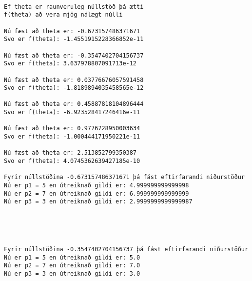 \documentclass[11pt]{article}
\begin{document}
    \begin{center}
    \end{center}
    { \hspace*{\fill} \\}
    
    \begin{Verbatim}[commandchars=\\\{\}]
Ef theta er raunveruleg núllstöð þá ætti
f(theta) að vera mjög nálægt núlli 

Nú fæst að theta er: -0.673157486371671
Svo er f(theta): -1.4551915228366852e-11 

Nú fæst að theta er: -0.3547402704156737
Svo er f(theta): 3.637978807091713e-12 

Nú fæst að theta er: 0.03776676057591458
Svo er f(theta): -1.8189894035458565e-12 

Nú fæst að theta er: 0.45887818104896444
Svo er f(theta): -6.923528417246416e-11 

Nú fæst að theta er: 0.9776728950003634
Svo er f(theta): -1.000444171950221e-11 

Nú fæst að theta er: 2.513852799350387
Svo er f(theta): 4.0745362639427185e-10 

Fyrir núllstöðina -0.673157486371671 þá fást eftirfarandi niðurstöður
Nú er p1 = 5 en útreiknað gildi er: 4.999999999999998
Nú er p2 = 7 en útreiknað gildi er: 6.999999999999999
Nú er p3 = 3 en útreiknað gildi er: 2.9999999999999987



    \end{Verbatim}

    \begin{center}
    \end{center}
    { \hspace*{\fill} \\}
    
    \begin{Verbatim}[commandchars=\\\{\}]
Fyrir núllstöðina -0.3547402704156737 þá fást eftirfarandi niðurstöður
Nú er p1 = 5 en útreiknað gildi er: 5.0
Nú er p2 = 7 en útreiknað gildi er: 7.0
Nú er p3 = 3 en útreiknað gildi er: 3.0



    \end{Verbatim}

    \begin{center}
    \end{center}
    { \hspace*{\fill} \\}
    
\end{document}
